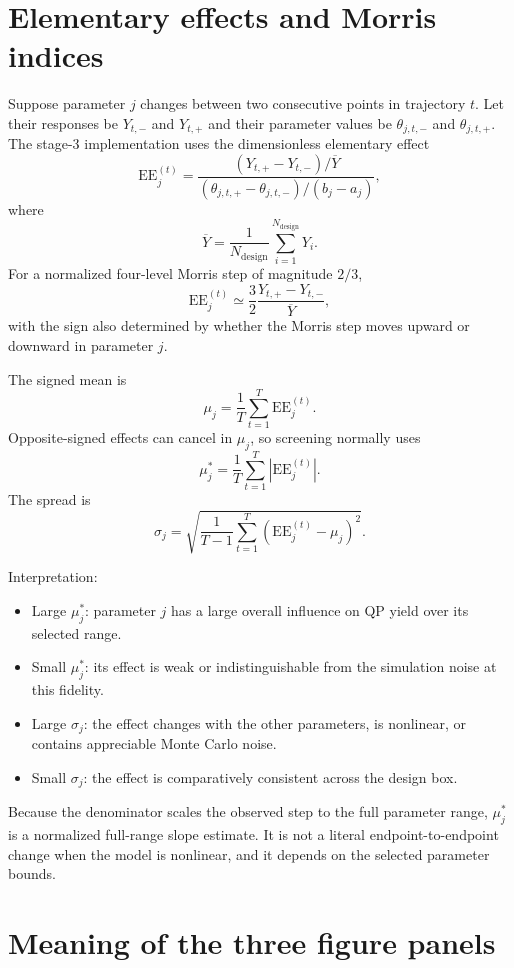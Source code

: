 \documentclass[11pt]{article}
\newcommand{\mustar}{\mu^{\ast}}
\newcommand{\EE}{\mathrm{EE}}
\begin{document}
\section{Elementary effects and Morris indices}

Suppose parameter $j$ changes between two consecutive points in trajectory
$t$.  Let their responses be $Y_{t,-}$ and $Y_{t,+}$ and their parameter
values be $\theta_{j,t,-}$ and $\theta_{j,t,+}$.  The stage-3 implementation
uses the dimensionless elementary effect
\[
\EE_j^{(t)}
=
\frac{
\left(Y_{t,+}-Y_{t,-}\right)/\overline{Y}
}{
\left(\theta_{j,t,+}-\theta_{j,t,-}\right)/(b_j-a_j)
},
\]
where
\[
\overline{Y}
=
\frac{1}{N_{\mathrm{design}}}
\sum_{i=1}^{N_{\mathrm{design}}}Y_i.
\]
For a normalized four-level Morris step of magnitude $2/3$,
\[
\EE_j^{(t)}
\simeq
\frac{3}{2}
\frac{Y_{t,+}-Y_{t,-}}{\overline{Y}},
\]
with the sign also determined by whether the Morris step moves upward or
downward in parameter $j$.

The signed mean is
\[
\mu_j
=
\frac1T\sum_{t=1}^{T}\EE_j^{(t)}.
\]
Opposite-signed effects can cancel in $\mu_j$, so screening normally uses
\[
\mustar_j
=
\frac1T\sum_{t=1}^{T}\left|\EE_j^{(t)}\right|.
\]
The spread is
\[
\sigma_j
=
\sqrt{
\frac{1}{T-1}
\sum_{t=1}^{T}
\left(\EE_j^{(t)}-\mu_j\right)^2
}.
\]

Interpretation:
\begin{itemize}[leftmargin=*]
\item Large $\mustar_j$: parameter $j$ has a large overall influence on QP
yield over its selected range.
\item Small $\mustar_j$: its effect is weak or indistinguishable from the
simulation noise at this fidelity.
\item Large $\sigma_j$: the effect changes with the other parameters, is
nonlinear, or contains appreciable Monte Carlo noise.
\item Small $\sigma_j$: the effect is comparatively consistent across the
design box.
\end{itemize}

Because the denominator scales the observed step to the full parameter
range, $\mustar_j$ is a normalized full-range slope estimate.  It is not a
literal endpoint-to-endpoint change when the model is nonlinear, and it
depends on the selected parameter bounds.

\section{Meaning of the three figure panels}
\end{document}

